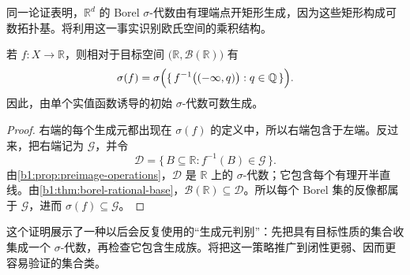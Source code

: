 同一论证表明，\(\mathbb R^d\) 的 Borel \(\sigma\)-代数由有理端点开矩形生成，因为这些矩形构成可数拓扑基。将利用这一事实识别欧氏空间的乘积结构。

\begin{proposition}
\label{b1:prop:real-initial-countable}
若 \(f:X\to\mathbb R\)，则相对于目标空间 \(\bigl(\mathbb R,\mathcal B(\mathbb R)\bigr)\) 有
\[
\sigma(f)
=\sigma\Bigl(\{\,f^{-1}\bigl(( -\infty,q)\bigr):q\in\mathbb Q\,\}\Bigr).
\]
因此，由单个实值函数诱导的初始 \(\sigma\)-代数可数生成。
\end{proposition}
\begin{proof}
右端的每个生成元都出现在 \(\sigma(f)\) 的定义中，所以右端包含于左端。反过来，把右端记为 \(\mathcal G\)，并令
\[
\mathcal D
=\{\,B\subseteq\mathbb R:f^{-1}(B)\in\mathcal G\,\}.
\]
由\cref{b1:prop:preimage-operations}，\(\mathcal D\) 是 \(\mathbb R\) 上的 \(\sigma\)-代数；它包含每个有理开半直线。由\cref{b1:thm:borel-rational-base}，\(\mathcal B(\mathbb R)\subseteq\mathcal D\)。所以每个 Borel 集的反像都属于 \(\mathcal G\)，进而 \(\sigma(f)\subseteq\mathcal G\)。
\end{proof}

这个证明展示了一种以后会反复使用的“生成元判别”：先把具有目标性质的集合收集成一个 \(\sigma\)-代数，再检查它包含生成族。将把这一策略推广到闭性更弱、因而更容易验证的集合类。
